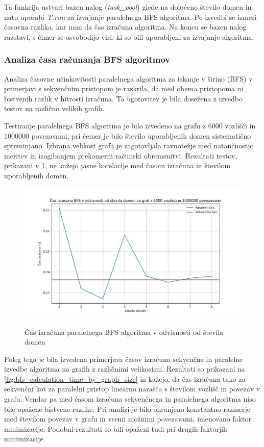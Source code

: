 \documentclass[mat1, tisk]{fmfdelo}
\begin{document}
Ta funkcija ustvari bazen nalog (\textit{task\_pool}) glede na določeno število domen in nato uporabi \textit{T.run} za
izvajanje paralelnega BFS algoritma. Po izvedbi se izmeri časovna razlika, kar nam da čas izračuna algoritma.
Na koncu se bazen nalog razstavi, s čimer se osvobodijo viri, ki so bili uporabljeni za izvajanje algoritma.

\subsubsection{Analiza časa računanja BFS algoritmov}

Analiza časovne učinkovitosti paralelnega algoritma za iskanje v širino (BFS) v primerjavi s sekvenčnim pristopom je
razkrila, da med obema pristopoma ni bistvenih razlik v hitrosti izračuna.
Ta ugotovitev je bila dosežena z izvedbo testov na različno velikih grafih.

Testiranje paralelnega BFS algoritma je bilo izvedeno na grafu z 6000 vozlišči in 1000000 povezavami, pri čemer je
bilo število uporabljenih domen sistematično spreminjano. Izbrana velikost grafa je zagotavljala ravnotežje med
natančnostjo meritev in izogibanjem prekomerni računski obremenitvi. Rezultati testov, prikazani v \ref{fig:bfs_calculation_time_by_num_domains},
ne kažejo jasne korelacije med časom izračuna in številom uporabljenih domen.

\begin{figure}[h!]
  \centering
  \caption{Čas izračuna paralelnega BFS algoritma v odvisnosti od števila domen}
  \includegraphics[width=15cm]{slike/bfs_v_odvisnosti_od_stevila_domen.jpg}
  \label{fig:bfs_calculation_time_by_num_domains}
\end{figure}

Poleg tega je bila izvedena primerjava časov izračuna sekvenčne in paralelne izvedbe algoritma na grafih z različnimi velikostmi.
Rezultati so prikazani na \ref{fig:bfs_calculation_time_by_graph_size} in kažejo, da čas izračuna tako za sekvenčni kot za paralelni
pristop linearno narašča s številom vozlišč in povezav v grafu. Vendar pa med časom izračuna sekvenčnega in paralelnega algoritma
niso bile opažene bistvene razlike. Pri analizi je bilo ohranjeno konstantno razmerje med številom povezav v grafu in vsemi
možnimi povezavami, imenovano faktor minimizacije. Podobni rezultati so bili opaženi tudi pri drugih faktorjih minimizacije.
\end{document}
